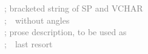 \documentclass{article}
\begin{document}
{\mbox{\ \ \ \ \ \ \ \ \ \ \ \ \ \ \ \ \ \ \ \ \ \ \ }\textcolor{gray}{; bracketed string of SP and VCHAR}\\
\mbox{\ \ \ \ \ \ \ \ \ \ \ \ \ \ \ \ \ \ \ \ \ \ \ }\textcolor{gray}{;\mbox{\ \ }without angles}\\
\mbox{\ \ \ \ \ \ \ \ \ \ \ \ \ \ \ \ \ \ \ \ \ \ \ }\textcolor{gray}{; prose description, to be used as}\\
\mbox{\ \ \ \ \ \ \ \ \ \ \ \ \ \ \ \ \ \ \ \ \ \ \ }\textcolor{gray}{;\mbox{\ \ }last resort}\\
\\

}
\end{document}
